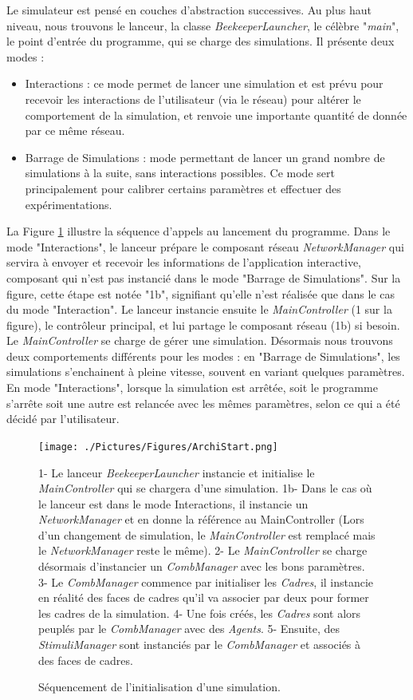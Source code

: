 			Le simulateur est pensé en couches d'abstraction successives. Au plus haut niveau, nous trouvons le lanceur, la classe \textit{BeekeeperLauncher}, le célèbre "\textit{main}", le point d'entrée du programme, qui se charge des simulations. Il présente deux modes :
	\begin{itemize}
		\item Interactions : ce mode permet de lancer une simulation et est prévu pour recevoir les interactions de l'utilisateur (via le réseau) pour altérer le comportement de la simulation, et renvoie une importante quantité de donnée par ce même réseau.
		\item Barrage de Simulations : mode permettant de lancer un grand nombre de simulations à la suite, sans interactions possibles. Ce mode sert principalement pour calibrer certains paramètres et effectuer des expérimentations.
	\end{itemize}				
			
			 La Figure \ref{ArchiStart} illustre la séquence d'appels au lancement du programme. Dans le mode "Interactions", le lanceur prépare le composant réseau \textit{NetworkManager} qui servira à envoyer et recevoir les informations de l'application interactive, composant qui n'est pas instancié dans le mode "Barrage de Simulations". Sur la figure, cette étape est notée "1b", signifiant qu'elle n'est réalisée que dans le cas du mode "Interaction". Le lanceur instancie ensuite le \textit{MainController} (1 sur la figure), le contrôleur principal, et lui partage le composant réseau (1b) si besoin. Le \textit{MainController} se charge de gérer une simulation. Désormais nous trouvons deux comportements différents pour les modes : en "Barrage de Simulations", les simulations s'enchainent à pleine vitesse, souvent en variant quelques paramètres. En mode "Interactions", lorsque la simulation est arrêtée, soit le programme s'arrête soit une autre est relancée avec les mêmes paramètres, selon ce qui a été décidé par l'utilisateur.
			 
			\begin{figure}
			\centering
			\texttt{[image: ./Pictures/Figures/ArchiStart.png]}
			\caption{Séquencement de l'initialisation d'une simulation.}{1- Le lanceur \textit{BeekeeperLauncher} instancie et initialise le \textit{MainController} qui se chargera d'une simulation. 1b- Dans le cas où le lanceur est dans le mode Interactions, il instancie un \textit{NetworkManager} et en donne la référence au MainController (Lors d'un changement de simulation, le \textit{MainController} est remplacé mais le \textit{NetworkManager} reste le même). 2- Le \textit{MainController} se charge désormais d'instancier un \textit{CombManager} avec les bons paramètres. 3- Le \textit{CombManager} commence par initialiser les \textit{Cadres}, il instancie en réalité des faces de cadres qu'il va associer par deux pour former les cadres de la simulation. 4- Une fois créés, les \textit{Cadres} sont alors peuplés par le \textit{CombManager} avec des \textit{Agents}. 5- Ensuite, des \textit{StimuliManager} sont instanciés par le \textit{CombManager} et associés à des faces de cadres.}
			\label{ArchiStart}
			\end{figure}
			
